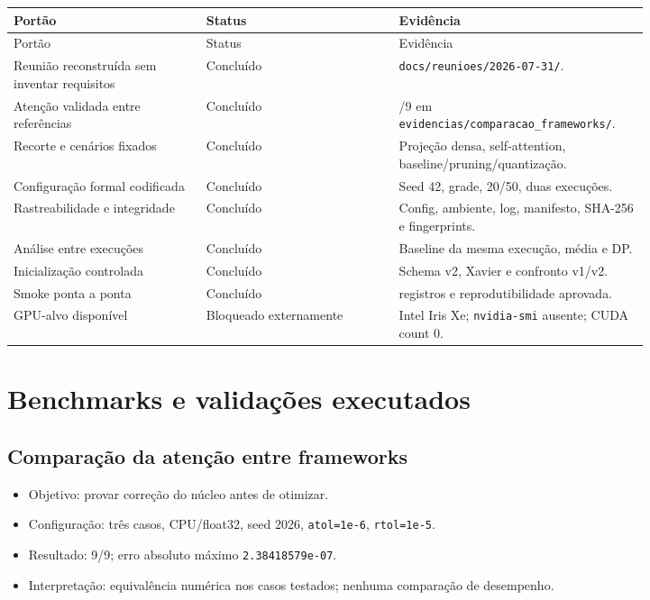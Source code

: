 \begin{longtable}{@{}>{\RaggedRight\arraybackslash}p{0.273\linewidth}>{\RaggedRight\arraybackslash}p{0.273\linewidth}>{\RaggedRight\arraybackslash}p{0.273\linewidth}@{}}
\toprule
Portão & Status & Evidência \\
\midrule
\endfirsthead
\toprule
Portão & Status & Evidência \\
\midrule
\endhead
Reunião reconstruída sem inventar requisitos & Concluído & \texttt{docs/\allowbreak{}reunioes/\allowbreak{}2026-07-31/\allowbreak{}}. \\
Atenção validada entre referências & Concluído & 9/9 em \texttt{evidencias/\allowbreak{}comparacao\_\allowbreak{}frameworks/\allowbreak{}}. \\
Recorte e cenários fixados & Concluído & Projeção densa, self-attention, baseline/\allowbreak{}pruning/\allowbreak{}quantização. \\
Configuração formal codificada & Concluído & Seed 42, grade, 20/50, duas execuções. \\
Rastreabilidade e integridade & Concluído & Config, ambiente, log, manifesto, SHA-256 e fingerprints. \\
Análise entre execuções & Concluído & Baseline da mesma execução, média e DP. \\
Inicialização controlada & Concluído & Schema v2, Xavier e confronto v1/v2. \\
Smoke ponta a ponta & Concluído & 12 registros e reprodutibilidade aprovada. \\
GPU-alvo disponível & Bloqueado externamente & Intel Iris Xe; \texttt{nvidia-smi} ausente; CUDA count 0. \\
\bottomrule
\end{longtable}



\section{Benchmarks e validações executados}



\subsection{Comparação da atenção entre frameworks}


\begin{itemize}
\item Objetivo: provar correção do núcleo antes de otimizar.
\item Configuração: três casos, CPU/float32, seed 2026, \texttt{atol=1e-6}, \texttt{rtol=1e-5}.
\item Resultado: 9/9; erro absoluto máximo \texttt{2.\allowbreak{}38418579e-07}.
\item Interpretação: equivalência numérica nos casos testados; nenhuma comparação de
desempenho.
\end{itemize}


